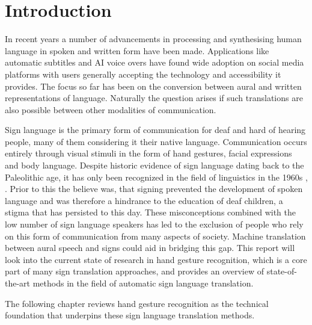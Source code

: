 \chapter{Introduction}
In recent years a number of advancements in processing and synthesising human language in spoken and written form have been made. 
Applications like automatic subtitles and AI voice overs have found wide adoption on social media platforms with users generally accepting the technology and accessibility it provides.
The focus so far has been on the conversion between aural and written representations of language. Naturally the question arises if such translations are also possible between other modalities of communication.

Sign language is the primary form of communication for deaf and hard of hearing people, many of them considering it their native language. Communication occurs entirely through visual stimuli in the form of hand gestures, facial expressions and body language. 
Despite historic evidence of sign language dating back to the Paleolithic age, it has only been recognized in the field of linguistics in the 1960s \cite{rubenSignLanguageIts2005}, \cite{goldin-meadowGestureSignLanguage2017}. Prior to this the believe was, that signing prevented the development of spoken language and was therefore a hindrance to the education of deaf children, a stigma that has persisted to this day. 
These misconceptions combined with the low number of sign language speakers has led to the exclusion of people who rely on this form of communication from many aspects of society. 
Machine translation between aural speech and signs could aid in bridging this gap. This report will look into the current state of research in hand gesture recognition, which is a core part of many sign translation approaches, and provides an overview of state-of-the-art methods in the field of automatic sign language translation.

The following chapter reviews hand gesture recognition as the technical foundation that underpins these sign language translation methods.

